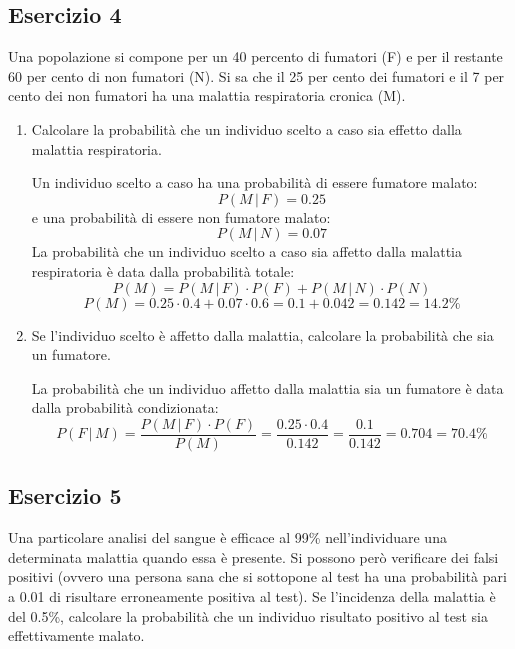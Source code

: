 \documentclass[a4paper]{article}
\theoremstyle{break}
\theoremstyle{break}
\theoremstyle{break}
\theoremstyle{break}
\begin{document}
\subsection{Esercizio 4}
Una popolazione si compone per un 40 percento di fumatori (F) e per il restante 60 per
cento di non fumatori (N). Si sa che il 25 per cento dei fumatori e il 7 per cento dei
non fumatori ha una malattia respiratoria cronica (M).
\begin{enumerate}
	\item Calcolare la probabilità che un individuo scelto a caso sia effetto dalla
	      malattia respiratoria.

	      \vspace{1em}
	      \noindent Un individuo scelto a caso ha una probabilità di essere fumatore malato:
	      \[
		      P(M\,|\,F) = 0.25
	      \]
	      e una probabilità di essere non fumatore malato:
	      \[
		      P(M\,|\,N) = 0.07
	      \]
	      La probabilità che un individuo scelto a caso sia affetto dalla malattia respiratoria
	      è data dalla probabilità totale:
	      \[
		      P(M) = P(M\,|\,F) \cdot P(F) + P(M\,|\,N) \cdot P(N)
	      \]
	      \[
		      P(M) = 0.25 \cdot 0.4 + 0.07 \cdot 0.6 = 0.1 + 0.042 = 0.142 = 14.2\%
	      \]
	\item Se l’individuo scelto è affetto dalla malattia, calcolare la probabilità che
	      sia un fumatore.

	      \vspace{1em}
	      \noindent La probabilità che un individuo affetto dalla malattia sia un fumatore è
	      data dalla probabilità condizionata:
	      \[
		      P(F\,|\,M) = \frac{P(M\,|\,F) \cdot P(F)}{P(M)} = \frac{0.25 \cdot 0.4}{0.142}
		      = \frac{0.1}{0.142} = 0.704 = 70.4\%
	      \]
\end{enumerate}

\subsection{Esercizio 5}
Una particolare analisi del sangue è efficace al 99\% nell’individuare una determinata
malattia quando essa è presente. Si possono però verificare dei falsi positivi
(ovvero una persona sana che si sottopone al test ha una probabilità pari a 0.01 di
risultare erroneamente positiva al test). Se l’incidenza della malattia è del 0.5\%,
calcolare la probabilità che un individuo risultato positivo al test sia effettivamente
malato.
\end{document}
